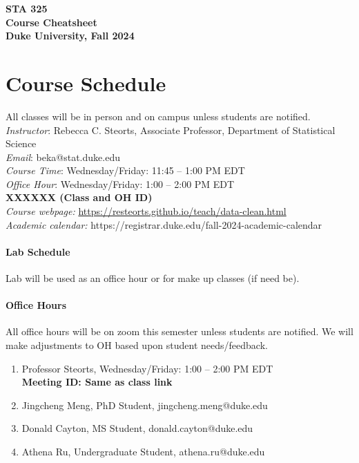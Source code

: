 \documentclass[11pt]{article}
\date{}
\begin{document}
\begin{center}
{\Large\bf STA 325\\ Course Cheatsheet} \\

{\Large\bf Duke University, Fall 2024} \\
\end{center}


\section{Course Schedule}
All classes will be in person and on campus unless students are notified. \\
\emph{Instructor}: Rebecca C. Steorts,  Associate Professor,  Department of Statistical Science\\
\emph{Email}: beka@stat.duke.edu\\
\emph{Course Time}: Wednesday/Friday: 11:45 -- 1:00 PM EDT \\
\emph{Office Hour}: Wednesday/Friday: 1:00 -- 2:00 PM EDT \\
\textbf{XXXXXX (Class and OH ID)}\\
\emph{Course webpage:} \url{https://resteorts.github.io/teach/data-clean.html} \\
\emph{Academic calendar:} https://registrar.duke.edu/fall-2024-academic-calendar


\paragraph{Lab Schedule}
Lab will be used as an office hour or for make up classes (if need be). 





\paragraph{Office Hours}
All office hours will be on zoom this semester unless students are notified. We will make adjustments to OH based upon student needs/feedback. 
\begin{enumerate}
\item Professor Steorts, Wednesday/Friday: 1:00 -- 2:00 PM EDT \\
\textbf{Meeting ID: Same as class link}
\item Jingcheng Meng, PhD Student, jingcheng.meng@duke.edu\\
\item Donald Cayton, MS Student, donald.cayton@duke.edu\\
\item Athena Ru, Undergraduate Student, athena.ru@duke.edu \\ 
\end{enumerate}
\end{document}

